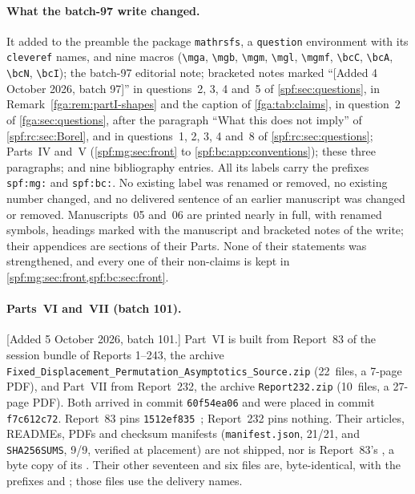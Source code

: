\documentclass[11pt]{article}
\numberwithin{equation}{section}
\theoremstyle{definition}
\theoremstyle{remark}
\theoremstyle{definition}
\newcommand{\mga}{\boldsymbol a}
\newcommand{\mgb}{\boldsymbol b}
\newcommand{\mgm}{\mathbf m}
\newcommand{\mgl}{\boldsymbol\ell}
\newcommand{\mgmf}{\mathbf m!}
\newcommand{\bcC}{C_{\!*}}
\newcommand{\bcA}{A_{\!*}}
\newcommand{\bcN}{\mathcal N_{\!*}}
\newcommand{\bcI}{\mathcal I}
\begin{document}
\paragraph{What the batch-97 write changed.} It added to the preamble the
package \texttt{mathrsfs}, a \texttt{question} environment with its
\texttt{cleveref} names, and nine macros (\verb|\mga|, \verb|\mgb|,
\verb|\mgm|, \verb|\mgl|, \verb|\mgmf|, \verb|\bcC|, \verb|\bcA|,
\verb|\bcN|, \verb|\bcI|); the batch-97 editorial note; bracketed notes
marked ``[Added 4 October 2026, batch 97]'' in questions~2, 3, 4 and~5 of
\cref{spf:sec:questions}, in Remark~\ref{fga:rem:partI-shapes} and the
caption of \cref{fga:tab:claims}, in question~2 of \cref{fga:sec:questions},
after the paragraph ``What this does not imply'' of \cref{spf:rc:sec:Borel},
and in questions~1, 2, 3, 4 and~8 of \cref{spf:rc:sec:questions}; Parts~IV
and~V (\cref{spf:mg:sec:front} to \cref{spf:bc:app:conventions}); these
three paragraphs; and nine bibliography entries. All its labels carry the
prefixes \texttt{spf:mg:} and \texttt{spf:bc:}. No existing label was renamed
or removed, no existing number changed, and no delivered sentence of an
earlier manuscript was changed or removed. Manuscripts~05 and~06 are printed
nearly in full, with renamed symbols, headings marked with the manuscript and
bracketed notes of the write; their appendices are sections of their Parts.
None of their statements was strengthened, and every one of their non-claims
is kept in \cref{spf:mg:sec:front,spf:bc:sec:front}.

\paragraph{Parts~VI and~VII (batch 101).}
[Added 5 October 2026, batch 101.] Part~VI is built from Report~83 of the
session bundle of Reports 1--243, the archive
\nolinkurl{Fixed_Displacement_Permutation_Asymptotics_Source.zip} (22~files,
a 7-page PDF), and Part~VII from Report~232, the archive
\nolinkurl{Report232.zip} (10~files, a 27-page PDF). Both arrived in commit
\texttt{60f54ea06} and were placed in commit \texttt{f7c612c72}. Report~83
pins \texttt{1512ef835}~\cite{fdProveIt}; Report~232 pins nothing. Their
articles, READMEs, PDFs and checksum manifests (\texttt{manifest.json},
21/21, and \texttt{SHA256SUMS}, 9/9, verified at placement) are not shipped,
nor is Report~83's , a byte copy of its
. Their other seventeen and six files are,
byte-identical, with the prefixes  and
; those files use the delivery names.
\end{document}
